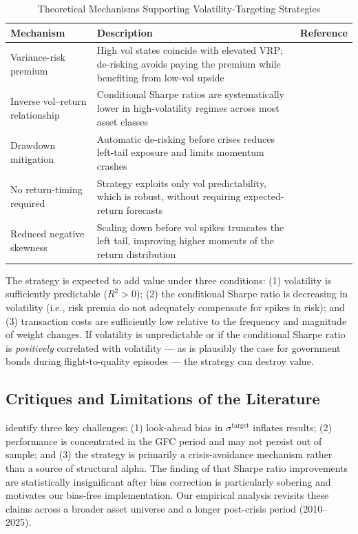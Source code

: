 \documentclass[12pt, a4paper]{article}
\newcommand{\stgt}{\sigma^{\mathrm{target}}}
\begin{document}
\begin{table}[H]
  \centering
  \caption{Theoretical Mechanisms Supporting Volatility-Targeting Strategies}
  \label{tab:theory}
  \small
  \begin{tabularx}{\textwidth}{lXl}
    \toprule
    \textbf{Mechanism} & \textbf{Description} & \textbf{Reference} \\
    \midrule
    Variance-risk premium
      & High vol states coincide with elevated VRP; de-risking avoids
        paying the premium while benefiting from low-vol upside
      & \citet{Moreira2017} \\[4pt]
    Inverse vol--return relationship
      & Conditional Sharpe ratios are systematically lower in
        high-volatility regimes across most asset classes
      & \citet{Harvey2018} \\[4pt]
    Drawdown mitigation
      & Automatic de-risking before crises reduces left-tail exposure
        and limits momentum crashes
      & \citet{Bongaerts2020} \\[4pt]
    No return-timing required
      & Strategy exploits only vol predictability, which is robust,
        without requiring expected-return forecasts
      & \citet{Harvey2018} \\[4pt]
    Reduced negative skewness
      & Scaling down before vol spikes truncates the left tail,
        improving higher moments of the return distribution
      & \citet{Moreira2017} \\
    \bottomrule
  \end{tabularx}
\end{table}

The strategy is expected to add value under three conditions: (1) volatility is
sufficiently predictable ($R^2 > 0$); (2) the conditional Sharpe ratio is decreasing in
volatility (i.e., risk premia do not adequately compensate for spikes in risk); and (3)
transaction costs are sufficiently low relative to the frequency and magnitude of weight
changes. If volatility is unpredictable or if the conditional Sharpe ratio is
\emph{positively} correlated with volatility --- as is plausibly the case for government
bonds during flight-to-quality episodes --- the strategy can destroy value.

\subsection{Critiques and Limitations of the Literature}

\citet{Liu2019} identify three key challenges: (1) look-ahead bias in $\stgt$ inflates
results; (2) performance is concentrated in the GFC period and may not persist out of
sample; and (3) the strategy is primarily a crisis-avoidance mechanism rather than a
source of structural alpha. The finding of \citet{Liu2019} that Sharpe ratio improvements
are statistically insignificant after bias correction is particularly sobering and
motivates our bias-free implementation. Our empirical analysis revisits these claims
across a broader asset universe and a longer post-crisis period (2010--2025).
\end{document}
